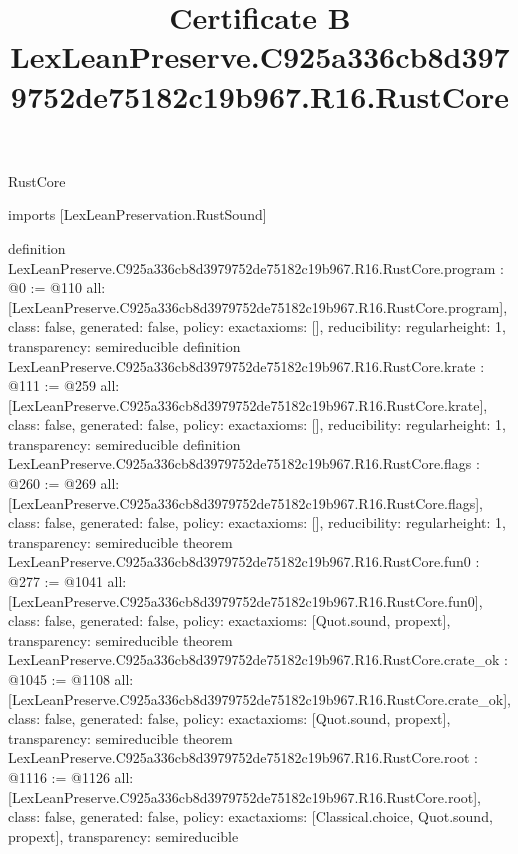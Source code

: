 \begin{lexlean}{RustCore}
\title{Certificate B LexLeanPreserve.C925a336cb8d3979752de75182c19b967.R16.RustCore}
\begin{coremodule}
imports [LexLeanPreservation.RustSound]

definition LexLeanPreserve.C925a336cb8d3979752de75182c19b967.R16.RustCore.program : @0 := @110 {
  all: [LexLeanPreserve.C925a336cb8d3979752de75182c19b967.R16.RustCore.program],
  class: false,
  generated: false,
  policy: exact{axioms: []},
  reducibility: regular{height: 1},
  transparency: semireducible
}
definition LexLeanPreserve.C925a336cb8d3979752de75182c19b967.R16.RustCore.krate : @111 := @259 {
  all: [LexLeanPreserve.C925a336cb8d3979752de75182c19b967.R16.RustCore.krate],
  class: false,
  generated: false,
  policy: exact{axioms: []},
  reducibility: regular{height: 1},
  transparency: semireducible
}
definition LexLeanPreserve.C925a336cb8d3979752de75182c19b967.R16.RustCore.flags : @260 := @269 {
  all: [LexLeanPreserve.C925a336cb8d3979752de75182c19b967.R16.RustCore.flags],
  class: false,
  generated: false,
  policy: exact{axioms: []},
  reducibility: regular{height: 1},
  transparency: semireducible
}
theorem LexLeanPreserve.C925a336cb8d3979752de75182c19b967.R16.RustCore.fun0 : @277 := @1041 {
  all: [LexLeanPreserve.C925a336cb8d3979752de75182c19b967.R16.RustCore.fun0],
  class: false,
  generated: false,
  policy: exact{axioms: [Quot.sound, propext]},
  transparency: semireducible
}
theorem LexLeanPreserve.C925a336cb8d3979752de75182c19b967.R16.RustCore.crate_ok : @1045 := @1108 {
  all: [LexLeanPreserve.C925a336cb8d3979752de75182c19b967.R16.RustCore.crate_ok],
  class: false,
  generated: false,
  policy: exact{axioms: [Quot.sound, propext]},
  transparency: semireducible
}
theorem LexLeanPreserve.C925a336cb8d3979752de75182c19b967.R16.RustCore.root : @1116 := @1126 {
  all: [LexLeanPreserve.C925a336cb8d3979752de75182c19b967.R16.RustCore.root],
  class: false,
  generated: false,
  policy: exact{axioms: [Classical.choice, Quot.sound, propext]},
  transparency: semireducible
}


\end{coremodule}
\end{lexlean}
